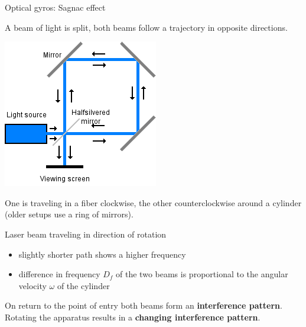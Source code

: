 \documentclass[compress]{beamer}
\begin{document}
\begin{frame}{Optical gyros: Sagnac effect}

    \begin{multicols}{2}

        A beam of light is split, both beams follow a trajectory in opposite
        directions.

        \begin{center}
            \includegraphics[width=0.6\linewidth]{sagnac-effect}
        \end{center}

        One is traveling in a fiber clockwise, the other counterclockwise
        around a cylinder (older setups use a ring of mirrors).

        Laser beam traveling in direction of rotation

            \begin{itemize}

                \item slightly shorter path \rightarrow shows a higher frequency
                \item difference in frequency $D_f$ of the two beams is proportional to the angular velocity $\omega$ of the cylinder
            \end{itemize}

        On return to the point of entry both beams form an {\bf interference
        pattern}. Rotating the apparatus results in a {\bf changing
        interference pattern}.

    \end{multicols}
\end{frame}
\end{document}
